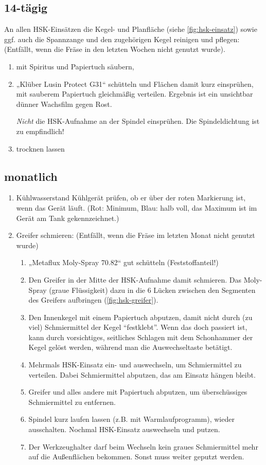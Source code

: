 \documentclass{\basedir/fablab-document}
\begin{document}
\subsection{14-tägig}
An allen HSK-Einsätzen die Kegel- und Planfläche (siehe \cref{fig:hsk-einsatz}) sowie ggf. auch die Spannzange und den zugehörigen Kegel reinigen und pflegen: (Entfällt, wenn die Fräse in den letzten Wochen nicht genutzt wurde).
\begin{enumerate}
	\item mit Spiritus und Papiertuch säubern, 
	\item „Klüber Lusin Protect G31“ schütteln und Flächen damit kurz einsprühen, mit sauberem Papiertuch gleichmäßig verteilen. Ergebnis ist ein unsichtbar dünner Wachsfilm gegen Rost.
	
	\emph{Nicht} die HSK-Aufnahme an der Spindel einsprühen. Die Spindeldichtung ist zu empfindlich!
	\item trocknen lassen
\end{enumerate}

\subsection{monatlich}

\begin{enumerate}
	\item Kühlwasserstand Kühlgerät prüfen, ob er über der roten Markierung ist, wenn das Gerät läuft. (Rot: Minimum, Blau: halb voll, das Maximum ist im Gerät am Tank gekennzeichnet.)
	\item Greifer schmieren: (Entfällt, wenn die Fräse im letzten Monat nicht genutzt wurde)
	\begin{enumerate}
        \item „Metaflux Moly-Spray 70.82“ gut schütteln (Feststoffanteil!)
        \item Den Greifer in der Mitte der HSK-Aufnahme damit schmieren. Das Moly-Spray (graue Flüssigkeit) dazu in die 6 Lücken zwischen den Segmenten des Greifers aufbringen (\cref{fig:hsk-greifer}). 
        \item Den Innenkegel mit einem Papiertuch abputzen, damit nicht durch (zu viel) Schmiermittel der Kegel \enquote{festklebt}. Wenn das doch passiert ist, kann durch vorsichtiges, seitliches Schlagen mit dem Schonhammer der Kegel gelöst werden, während man die Auswechseltaste betätigt.
        \item Mehrmals HSK-Einsatz ein- und auswechseln, um Schmiermittel zu verteilen. Dabei Schmiermittel abputzen, das am Einsatz hängen bleibt.
        \item Greifer und alles andere mit Papiertuch abputzen, um überschüssiges Schmiermittel zu entfernen.
        \item Spindel kurz laufen lassen (z.B. mit Warmlaufprogramm), wieder ausschalten. Nochmal HSK-Einsatz auswechseln und putzen.
        \item Der Werkzeughalter darf beim Wechseln kein graues Schmiermittel mehr auf die Außenflächen bekommen. Sonst muss weiter geputzt werden.
	\end{enumerate}
\end{enumerate}
\end{document}
